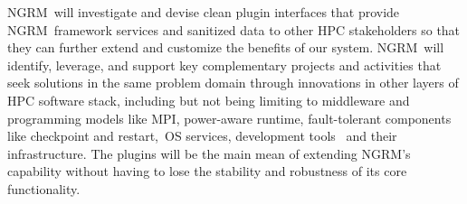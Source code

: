 \documentclass{article}
\newcommand{\ngrm}{NGRM}
\begin{document}
\ngrm\ will investigate and devise clean plugin interfaces that
provide \ngrm\ framework services and sanitized data to other HPC
stakeholders so that they can further extend and customize the benefits
of our system. \ngrm\ will identify, leverage, and support key complementary
projects and activities that seek solutions in the same problem domain
through innovations in other layers of HPC software stack, including but
not being limiting to middleware and programming models like MPI,
power-aware runtime, fault-tolerant components like checkpoint and
restart, OS services, development tools  and their infrastructure.
The plugins will be the main mean of extending \ngrm’s capability
without having to lose the stability and robustness of its core
functionality.













\appendix




\end{document}
